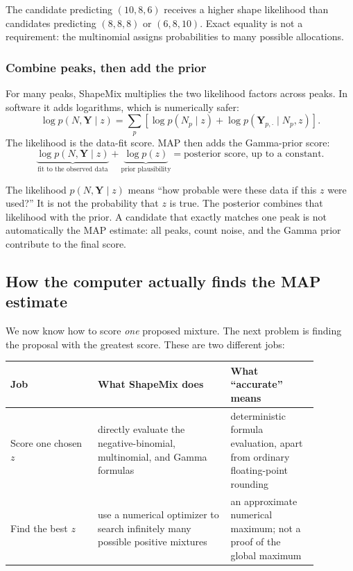 \documentclass[11pt]{article}
\begin{document}
The candidate predicting \((10,8,6)\) receives a higher shape likelihood than
candidates predicting \((8,8,8)\) or \((6,8,10)\).  Exact equality is not a
requirement: the multinomial assigns probabilities to many possible allocations.

\subsubsection*{Combine peaks, then add the prior}

For many peaks, ShapeMix multiplies the two likelihood factors across peaks.  In
software it adds logarithms, which is numerically safer:
\[
\log p(N,\boldsymbol Y\mid z)
=
\sum_p\left[
\log p(N_p\mid z)
+
\log p(\boldsymbol Y_{p,\cdot}\mid N_p,z)
\right].
\]
The likelihood is the data-fit score. MAP then adds the Gamma-prior score:
\[
\underbrace{\log p(N,\boldsymbol Y\mid z)}_{\text{fit to the observed data}}
+
\underbrace{\log p(z)}_{\text{prior plausibility}}
=
\text{posterior score, up to a constant}.
\]

\begin{watchout}
The likelihood \(p(N,\boldsymbol Y\mid z)\) means “how probable were these data
if this \(z\) were used?” It is not the probability that \(z\) is true.  The
posterior combines that likelihood with the prior.  A candidate that exactly
matches one peak is not automatically the MAP estimate: all peaks, count noise,
and the Gamma prior contribute to the final score.
\end{watchout}

\subsection{How the computer actually finds the MAP estimate}

We now know how to score \emph{one} proposed mixture. The next problem is finding
the proposal with the greatest score. These are two different jobs:

\begin{center}
\begin{tabular}{L{0.25\linewidth}L{0.38\linewidth}L{0.25\linewidth}}
\toprule
Job & What ShapeMix does & What “accurate” means \\
\midrule
Score one chosen \(z\) & directly evaluate the negative-binomial, multinomial,
and Gamma formulas & deterministic formula evaluation, apart from ordinary
floating-point rounding \\
Find the best \(z\) & use a numerical optimizer to search infinitely many
possible positive mixtures & an approximate numerical maximum; not a proof of
the global maximum \\
\bottomrule
\end{tabular}
\end{center}
\end{document}
